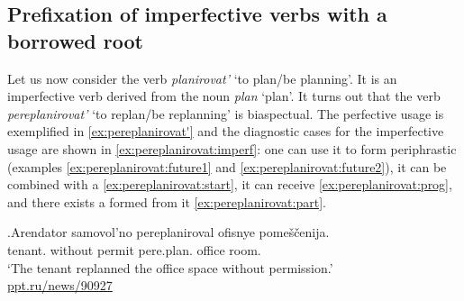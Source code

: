 

\subsection{Prefixation of imperfective verbs with a borrowed root}\label{subsection:perf:imperf}
Let us now consider the verb \textit{planirovat'} `to plan/be planning'. It is an imperfective verb derived from the noun \textit{plan} `plan'. It turns out that the verb \textit{pereplanirovat'} `to replan/be replanning' is biaspectual. The perfective usage is exemplified in \ref{ex:pereplanirovat'} and the diagnostic cases for the imperfective usage are shown in \ref{ex:pereplanirovat:imperf}: one can use it to form periphrastic  (examples \ref{ex:pereplanirovat:future1} and \ref{ex:pereplanirovat:future2}), it can be combined with a  \ref{ex:pereplanirovat:start}, it can receive  \ref{ex:pereplanirovat:prog}, and there exists a  formed from it \ref{ex:pereplanirovat:part}.\largerpage[-2]

\exg.\label{ex:pereplanirovat'}Arendator samovol'no pereplaniroval\textsuperscript{\PF} ofisnye pome\v{s}\v{c}enija.\\
tenant. {without permit} pere.plan. office room.\\
\trans `The tenant replanned the office space without permission.'\\\hbox{}\hfill\hbox{\url{ppt.ru/news/90927}}


